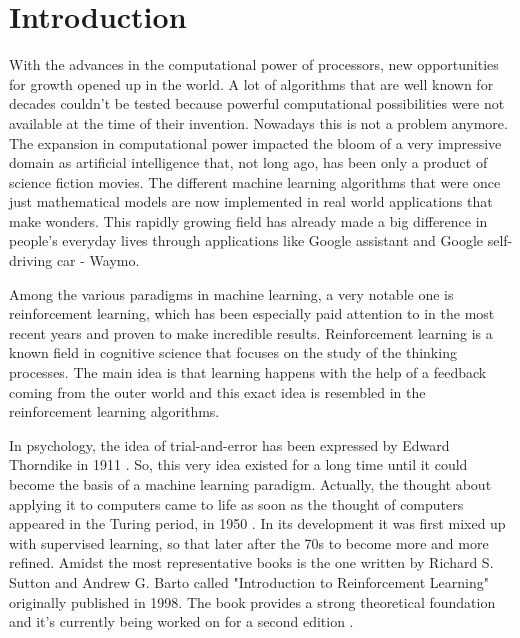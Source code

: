 \chapter{Introduction}\label{Introduction}
With the advances in the computational power of processors, new opportunities for growth opened up in the world. A lot of algorithms that are well known for decades couldn't be tested because powerful computational possibilities were not available at the time of their invention. Nowadays this is not a problem anymore. The expansion in computational power impacted the bloom of a very impressive domain as artificial intelligence that, not long ago, has been only a product of science fiction movies. The different machine learning algorithms that were once just mathematical models are now implemented in real world applications that make wonders. This rapidly growing field has already made a big difference in people's everyday lives through applications like Google assistant and Google self-driving car - Waymo.

Among the various paradigms in machine learning, a very notable one is reinforcement learning, which has been especially paid attention to in the most recent years and proven to make incredible results. Reinforcement learning is a known field in cognitive science that focuses on the study of the thinking processes. The main idea is that learning happens with the help of a feedback coming from the outer world and this exact idea is resembled in the reinforcement learning algorithms. 

In psychology, the idea of trial-and-error has been expressed by Edward Thorndike in 1911 \cite{Sutton:1998:IRL:551283}. So, this very idea existed for a long time until it could become the basis of a machine learning paradigm. Actually, the thought about applying it to computers came to life as soon as the thought of computers appeared in the Turing period, in 1950 \cite{Sutton:1998:IRL:551283}. In its development it was first mixed up with supervised learning, so that later after the 70s to become more and more refined. Amidst the most representative books is the one written by Richard S. Sutton and Andrew G. Barto called "Introduction to Reinforcement Learning" \cite{Sutton:1998:IRL:551283} originally published in 1998. The book \cite{Sutton:1998:IRL:551283} provides a strong theoretical foundation and it's currently being worked on for a second edition \cite{Sutton}.

